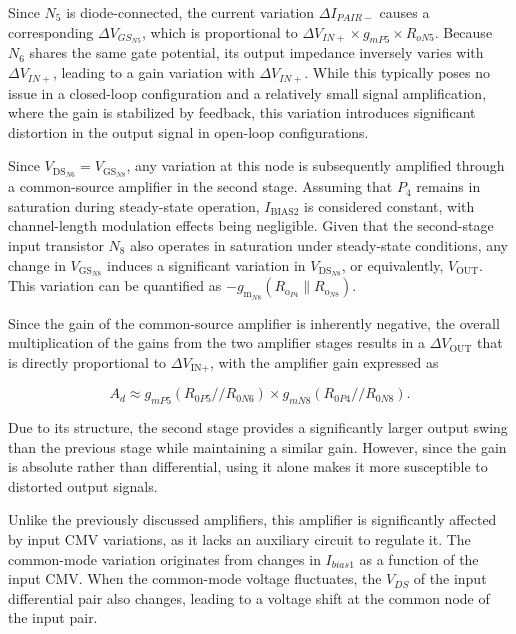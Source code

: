 \documentclass[12pt]{article}
\begin{document}
Since $N_5$ is diode-connected, the current variation $\Delta I_{PAIR-}$ causes a corresponding $\Delta V_{GS_{N5}}$, which is proportional to $\Delta V_{IN+} \times g_{mP5}  \times R_{oN5}$.  Because $N_6$ shares the same gate potential, its output impedance inversely varies with $\Delta V_{IN+}$,  leading to a gain variation with $\Delta V_{IN+}$. While this typically poses no issue in a closed-loop configuration and a relatively small signal amplification, where the gain is stabilized by feedback, this variation introduces significant distortion in the output signal in open-loop configurations.





Since \( V_{\text{DS}_{N6}} = V_{\text{GS}_{N8}} \), any variation at this node is subsequently amplified through a common-source amplifier in the second stage. Assuming that \( P_4 \) remains in saturation during steady-state operation, \( I_{\text{BIAS2}} \) is considered constant, with channel-length modulation effects being negligible. Given that the second-stage input transistor \( N_8 \) also operates in saturation under steady-state conditions, any change in \( V_{\text{GS}_{N8}} \) induces a significant variation in \( V_{\text{DS}_{N8}} \), or equivalently, \( V_{\text{OUT}} \).  This variation can be quantified as \( -g_{\text{m}_{N8}} \left( R_{\text{o}_{P4}} \parallel R_{\text{o}_{N8}} \right) \).

Since the gain of the common-source amplifier is inherently negative, the overall multiplication of the gains from the two amplifier stages results in a \(\Delta V_{\text{OUT}}\) that is directly proportional to \(\Delta V_{\text{IN+}}\), with the amplifier gain expressed as

\begin{equation}
A_d \approx  g_{mP5}(R_{0P5}//R_{0N6})\times g_{mN8}(R_{0P4}//R_{0N8}).
\label{gainnnn}
\end{equation}



Due to its structure, the second stage provides a significantly larger output swing than the previous stage while maintaining a similar gain. However, since the gain is absolute rather than differential, using it alone makes it more susceptible to distorted output signals. 


Unlike the previously discussed amplifiers, this amplifier is significantly affected by input CMV variations, as it lacks an auxiliary circuit to regulate it. The common-mode variation originates from changes in $I_{bias1}$ as a function of the input CMV. When the common-mode voltage fluctuates, the $V_{DS}$ of the input differential pair also changes, leading to a voltage shift at the common node of the input pair. 
\end{document}
